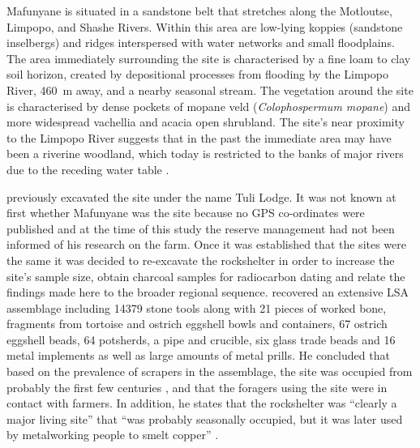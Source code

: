 \documentclass{ijsra}
\begin{document}
	Mafunyane  is situated in a sandstone belt that stretches along the Motloutse, Limpopo, and Shashe Rivers. Within this area are low-lying koppies (sandstone inselbergs) and ridges interspersed with water networks and small floodplains. The area immediately surrounding the site is characterised by a fine loam to clay soil horizon, created by depositional processes from flooding by the Limpopo River, \SI{460}{\meter} away, and a nearby seasonal stream. 
	The vegetation around the site is characterised by dense pockets of mopane veld (\emph{Colophospermum mopane}) and more widespread vachellia and acacia open shrubland. The site’s near proximity to the Limpopo River suggests that in the past the immediate area may have been a riverine woodland, which today is restricted to the banks of major rivers due to the receding water table \parencite{Alexander_1984}.
	
	\textcite{Walker_1994} previously excavated the site under the name Tuli Lodge. It was not known at first whether Mafunyane was the \textcite{Walker_1994} site because no GPS co-ordinates were published and at the time of this study the reserve management had not been informed of his research on the farm. Once it was established that the sites were the same it was decided to re-excavate the rockshelter in order to increase the site’s sample size, obtain charcoal samples for radiocarbon dating and relate the findings made here to the broader regional sequence. \textcite{Walker_1994} recovered an extensive LSA assemblage including \num{14379} stone tools along with 21 pieces of worked bone, fragments from tortoise and ostrich eggshell bowls and containers, 67 ostrich eggshell beads, 64 potsherds, a pipe and crucible, six glass trade beads and 16 metal implements as well as large amounts of metal prills. 
	He concluded that based on the prevalence of scrapers in the assemblage, the site was occupied from probably the first few centuries \AD, and that the foragers using the site were in contact with farmers. 
In addition, he states that the rockshelter was \enquote{clearly a major living site} that 
	\enquote{was probably seasonally occupied, but it was later used by metalworking people to smelt copper} \parencite[10]{Walker_1994}. 
	
\end{document}
